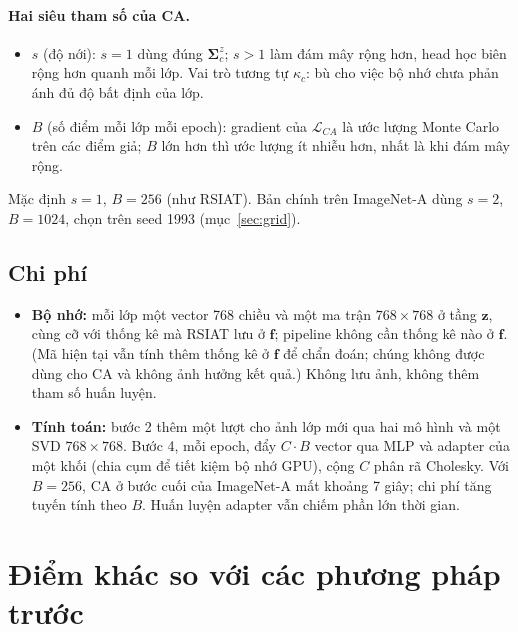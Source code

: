 \documentclass[11pt]{article}
\newcommand{\bSigma}{\boldsymbol{\Sigma}}
\newcommand{\vf}{\mathbf{f}}
\newcommand{\vz}{\mathbf{z}}
\newcommand{\Sz}{\bSigma^{z}}
\begin{document}
\paragraph{Hai siêu tham số của CA.}
\begin{itemize}
\item $s$ (độ nới): $s=1$ dùng đúng $\Sz_c$; $s>1$ làm đám mây rộng hơn, head học biên rộng hơn quanh mỗi lớp. Vai trò
      tương tự $\kappa_c$: bù cho việc bộ nhớ chưa phản ánh đủ độ bất định của lớp.
\item $B$ (số điểm mỗi lớp mỗi epoch): gradient của $\mathcal L_{CA}$ là ước lượng Monte Carlo trên các điểm giả; $B$
      lớn hơn thì ước lượng ít nhiễu hơn, nhất là khi đám mây rộng.
\end{itemize}
Mặc định $s=1$, $B=256$ (như RSIAT). Bản chính trên ImageNet-A dùng $s=2$, $B=1024$, chọn trên seed 1993
(mục~\ref{sec:grid}).

\subsection{Chi phí}
\begin{itemize}
\item \textbf{Bộ nhớ:} mỗi lớp một vector 768 chiều và một ma trận $768\times768$ ở tầng $\vz$, cùng cỡ với thống kê mà
      RSIAT lưu ở $\vf$; pipeline không cần thống kê nào ở $\vf$. (Mã hiện tại vẫn tính thêm thống kê ở $\vf$ để chẩn
      đoán; chúng không được dùng cho CA và không ảnh hưởng kết quả.) Không lưu ảnh, không thêm tham số huấn luyện.
\item \textbf{Tính toán:} bước 2 thêm một lượt cho ảnh lớp mới qua hai mô hình và một SVD $768\times768$. Bước 4, mỗi
      epoch, đẩy $C\cdot B$ vector qua MLP và adapter của một khối (chia cụm để tiết kiệm bộ nhớ GPU), cộng $C$ phân rã
      Cholesky. Với $B=256$, CA ở bước cuối của ImageNet-A mất khoảng 7 giây; chi phí tăng tuyến tính theo $B$. Huấn
      luyện adapter vẫn chiếm phần lớn thời gian.
\end{itemize}

\section{Điểm khác so với các phương pháp trước}\label{sec:diff}
\end{document}
